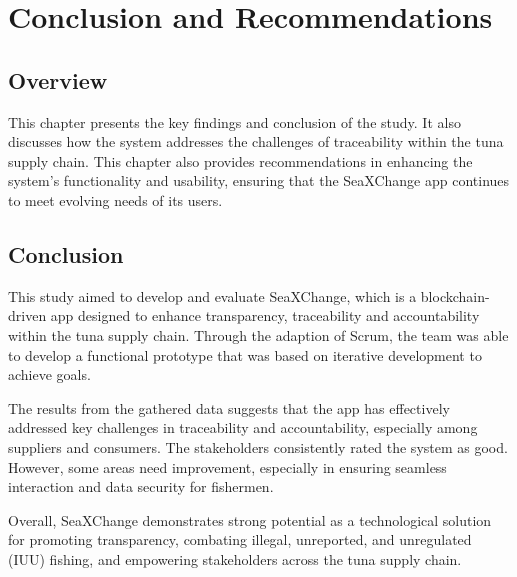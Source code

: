 \chapter{Conclusion and Recommendations}
\section{Overview}
This chapter  presents the key findings and conclusion of the study. It also discusses how the system addresses the challenges of traceability within the tuna supply chain. This chapter also provides recommendations in enhancing the system's functionality and usability, ensuring that the SeaXChange app continues to meet evolving needs of its users. 


\section{Conclusion}
This study aimed to develop and evaluate SeaXChange, which is a blockchain-driven app designed to enhance transparency, traceability and accountability within the tuna supply chain. Through the adaption of Scrum, the team was able to develop a functional prototype that was based on iterative development to achieve goals. 

\noindent The results from the gathered data suggests that the app has effectively addressed key challenges in traceability and accountability, especially among suppliers and consumers. The stakeholders consistently rated the system as good. However, some areas need improvement, especially in ensuring seamless interaction and data security for fishermen.

\noindent Overall, SeaXChange demonstrates strong potential as a technological solution for promoting transparency, combating illegal, unreported, and unregulated (IUU) fishing, and empowering stakeholders across the tuna supply chain.

